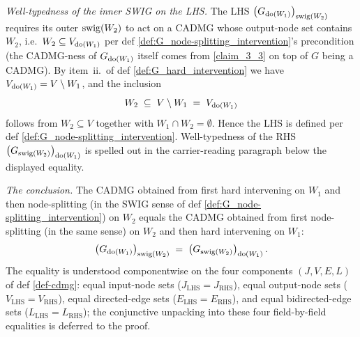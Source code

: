 \documentclass[main]{subfiles}
\begin{document}
\begin{Lem}
    \emph{Well-typedness of the inner SWIG on the LHS.}
    The LHS $\left ( G_{\operatorname{do}(W_1)} \right )_{\mathrm{swig}(W_2)}$ requires its outer $\mathrm{swig}(W_2)$ to act on a CADMG whose output-node set contains $W_2$, i.e.\ $W_2 \subseteq V_{\operatorname{do}(W_1)}$ per def \ref{def:G_node-splitting_intervention}'s precondition (the CADMG-ness of $G_{\operatorname{do}(W_1)}$ itself comes from \ref{claim_3_3} on top of $G$ being a CADMG). By item~ii.\ of def \ref{def:G_hard_intervention} we have $V_{\operatorname{do}(W_1)} = V \setminus W_1$, and the inclusion
    \[ W_2 \;\subseteq\; V \setminus W_1 \;=\; V_{\operatorname{do}(W_1)} \]
    follows from $W_2 \subseteq V$ together with $W_1 \cap W_2 = \emptyset$. Hence the LHS is defined per def \ref{def:G_node-splitting_intervention}. Well-typedness of the RHS $\left ( G_{\mathrm{swig}(W_2)} \right )_{\operatorname{do}(W_1)}$ is spelled out in the carrier-reading paragraph below the displayed equality.

    \emph{The conclusion.}
    The CADMG obtained from first hard intervening on $W_1$ and then node-splitting (in the SWIG sense of def \ref{def:G_node-splitting_intervention}) on $W_2$ equals the CADMG obtained from first node-splitting (in the same sense) on $W_2$ and then hard intervening on $W_1$:
    \[ \left ( G_{\operatorname{do}(W_1)} \right )_{\mathrm{swig}(W_2)} \;=\; \left ( G_{\mathrm{swig}(W_2)} \right )_{\operatorname{do}(W_1)}. \]
    The equality is understood componentwise on the four components $(J, V, E, L)$ of def \ref{def-cdmg}: equal input-node sets ($J_{\text{LHS}} = J_{\text{RHS}}$), equal output-node sets ($V_{\text{LHS}} = V_{\text{RHS}}$), equal directed-edge sets ($E_{\text{LHS}} = E_{\text{RHS}}$), and equal bidirected-edge sets ($L_{\text{LHS}} = L_{\text{RHS}}$); the conjunctive unpacking into these four field-by-field equalities is deferred to the proof.


\end{Lem}
\end{document}
